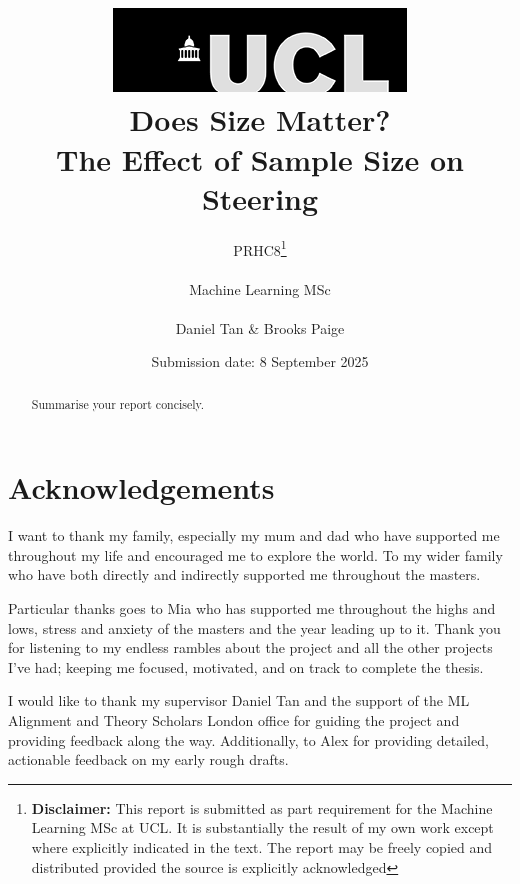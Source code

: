 \documentclass[tikz, 12pt]{report}
\title{{ \includegraphics[scale=.5]{figures/ucl_logo.png}}\\
{{\Huge Does Size Matter?}\\{\Large The Effect of Sample Size on Steering}}\\
}
\date{Submission date: 8 September 2025}
\author{PRHC8\thanks{
{\bf Disclaimer:}
This report is submitted as part requirement for the Machine Learning MSc at UCL. It is
substantially the result of my own work except where explicitly indicated in the text.
The report may be freely copied and distributed provided the source is explicitly acknowledged}
\\ \\
Machine Learning MSc\\ \\
Daniel Tan \& Brooks Paige}
\begin{document}
\linenumbers





\onehalfspacing
\maketitle

\chapter*{Acknowledgements}

I want to thank my family, especially my mum and dad who have supported me throughout my life and encouraged me to explore the world.
To my wider family who have both directly and indirectly supported me throughout the masters.

Particular thanks goes to Mia who has supported me throughout the highs and lows, stress and anxiety of the masters and the year leading up to it.
Thank you for listening to my endless rambles about the project and all the other projects I've had; keeping me focused, motivated, and on track to complete the thesis.

I would like to thank my supervisor Daniel Tan and the support of the ML Alignment and Theory Scholars London office for guiding the project and providing feedback along the way.
Additionally, to Alex for providing detailed, actionable feedback on my early rough drafts.

\begin{abstract}
Summarise your report concisely.
\end{abstract}

\tableofcontents
\listoffigures
\listoftables
\clearpage
{}









\appendix





\end{document}
